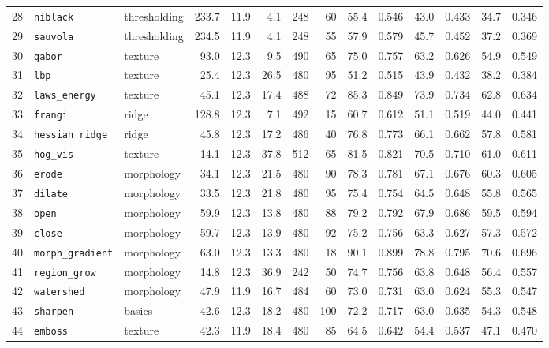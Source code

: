 \begin{landscape}
\begin{longtable}{@{}r >{\raggedright\arraybackslash\ttfamily}p{2.8cm} >{\raggedright\arraybackslash}p{1.7cm} r r r r r r r r r r r@{}}
28 & \texttt{niblack} & thresholding & 233.7 & 11.9 & 4.1 & 248 & 60 & 55.4 & 0.546 & 43.0 & 0.433 & 34.7 & 0.346 \\
29 & \texttt{sauvola} & thresholding & 234.5 & 11.9 & 4.1 & 248 & 55 & 57.9 & 0.579 & 45.7 & 0.452 & 37.2 & 0.369 \\
30 & \texttt{gabor} & texture & 93.0 & 12.3 & 9.5 & 490 & 65 & 75.0 & 0.757 & 63.2 & 0.626 & 54.9 & 0.549 \\
31 & \texttt{lbp} & texture & 25.4 & 12.3 & 26.5 & 480 & 95 & 51.2 & 0.515 & 43.9 & 0.432 & 38.2 & 0.384 \\
32 & \texttt{laws\_energy} & texture & 45.1 & 12.3 & 17.4 & 488 & 72 & 85.3 & 0.849 & 73.9 & 0.734 & 62.8 & 0.634 \\
33 & \texttt{frangi} & ridge & 128.8 & 12.3 & 7.1 & 492 & 15 & 60.7 & 0.612 & 51.1 & 0.519 & 44.0 & 0.441 \\
34 & \texttt{hessian\_ridge} & ridge & 45.8 & 12.3 & 17.2 & 486 & 40 & 76.8 & 0.773 & 66.1 & 0.662 & 57.8 & 0.581 \\
35 & \texttt{hog\_vis} & texture & 14.1 & 12.3 & 37.8 & 512 & 65 & 81.5 & 0.821 & 70.5 & 0.710 & 61.0 & 0.611 \\
36 & \texttt{erode} & morphology & 34.1 & 12.3 & 21.5 & 480 & 90 & 78.3 & 0.781 & 67.1 & 0.676 & 60.3 & 0.605 \\
37 & \texttt{dilate} & morphology & 33.5 & 12.3 & 21.8 & 480 & 95 & 75.4 & 0.754 & 64.5 & 0.648 & 55.8 & 0.565 \\
38 & \texttt{open} & morphology & 59.9 & 12.3 & 13.8 & 480 & 88 & 79.2 & 0.792 & 67.9 & 0.686 & 59.5 & 0.594 \\
39 & \texttt{close} & morphology & 59.7 & 12.3 & 13.9 & 480 & 92 & 75.2 & 0.756 & 63.3 & 0.627 & 57.3 & 0.572 \\
40 & \texttt{morph\_gradient} & morphology & 63.0 & 12.3 & 13.3 & 480 & 18 & 90.1 & 0.899 & 78.8 & 0.795 & 70.6 & 0.696 \\
41 & \texttt{region\_grow} & morphology & 14.8 & 12.3 & 36.9 & 242 & 50 & 74.7 & 0.756 & 63.8 & 0.648 & 56.4 & 0.557 \\
42 & \texttt{watershed} & morphology & 47.9 & 11.9 & 16.7 & 484 & 60 & 73.0 & 0.731 & 63.0 & 0.624 & 55.3 & 0.547 \\
43 & \texttt{sharpen} & basics & 42.6 & 12.3 & 18.2 & 480 & 100 & 72.2 & 0.717 & 63.0 & 0.635 & 54.3 & 0.548 \\
44 & \texttt{emboss} & texture & 42.3 & 11.9 & 18.4 & 480 & 85 & 64.5 & 0.642 & 54.4 & 0.537 & 47.1 & 0.470 \\

\end{longtable}
\end{landscape}
